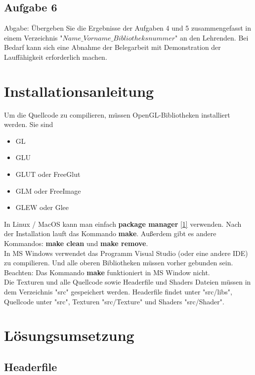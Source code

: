 \documentclass[12pt]{article}
\begin{document}
\subsection{Aufgabe 6}
Abgabe: Übergeben Sie die Ergebnisse der Aufgaben 4 und 5 zusammengefasst in einem Verzeichnis "$Name\_Vorname\_Bibliotheksnummer$" an den Lehrenden. Bei Bedarf kann sich eine Abnahme der Belegarbeit mit Demonstration der Lauffähigkeit erforderlich machen. \\

\pagebreak

\section{Installationsanleitung}

Um die Quellcode zu compilieren, müssen OpenGL-Bibliotheken installiert werden. Sie sind 

\begin{itemize}
	\item GL
	\item GLU
	\item GLUT oder FreeGlut
	\item GLM oder FreeImage
	\item GLEW oder Glee
\end{itemize}

In Linux / MacOS kann man einfach \textbf{package manager} \hyperref[sec:pacman]{[1]} verwenden. Nach der Installation lauft das Kommando \textbf{make}. Außerdem gibt es andere Kommandos: \textbf{make clean} und \textbf{make remove}. \\
In MS Windows verwendet das Programm Visual Studio (oder eine andere IDE) zu compilieren. Und alle oberen Bibliotheken müssen vorher gebunden sein. Beachten: Das Kommando \textbf{make} funktioniert in MS Window nicht. \\

Die Texturen und alle Quellcode sowie Headerfile und Shaders Dateien müssen in dem Verzeichnis "src" gespeichert werden. 
Headerfile findet unter "src/libs", Quellcode unter "src", Texturen "src/Texture" und Shaders "src/Shader". \\
\pagebreak

\section{Lösungsumsetzung}

\subsection{Headerfile}

\end{document}

